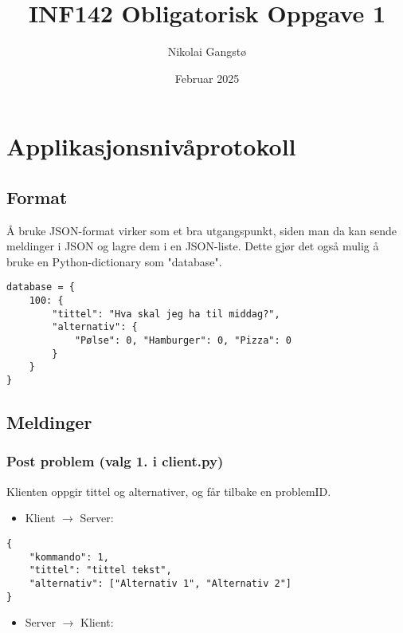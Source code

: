 \documentclass[hidelinks]{article}
\title{INF142 Obligatorisk Oppgave 1}
\author{Nikolai Gangstø}
\date{Februar 2025}
\begin{document}
\maketitle

\tableofcontents

\newpage

\section{Applikasjonsnivåprotokoll}

\subsection{Format}

Å bruke JSON-format virker som et bra utgangspunkt, siden man da kan sende meldinger i JSON og lagre dem i en JSON-liste. Dette gjør det også mulig å bruke en Python-dictionary som "database".

\begin{verbatim}
database = {
    100: {
        "tittel": "Hva skal jeg ha til middag?",
        "alternativ": {
            "Pølse": 0, "Hamburger": 0, "Pizza": 0
        }
    }
}
\end{verbatim}

\subsection{Meldinger}

\subsubsection{Post problem (valg 1. i client.py)}

Klienten oppgir tittel og alternativer, og får tilbake en problemID.

\begin{itemize}
    \item Klient \(\rightarrow\) Server:
\end{itemize}

\begin{verbatim}
{
    "kommando": 1,
    "tittel": "tittel tekst",
    "alternativ": ["Alternativ 1", "Alternativ 2"]
}
\end{verbatim}

\begin{itemize}
    \item Server \(\rightarrow\) Klient:
\end{itemize}
\end{document}
